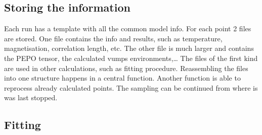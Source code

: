 \subsection{Storing the information}

Each run has a template with all the common model info. For each point 2 files are stored. One file contains the info and results, such as temperature, magnetisation, correlation length, etc. The other file is much larger and contains the PEPO tensor, the calculated vumps environments,\dots
The files of the first kind are used in other calculations, such as fitting procedure.  Reassembling the files into one structure happens in a central function. Another function is able to reprocess already calculated points. The sampling can be continued from where is was last stopped.

\subsection{Fitting}\label{subsec:qphasediag}

